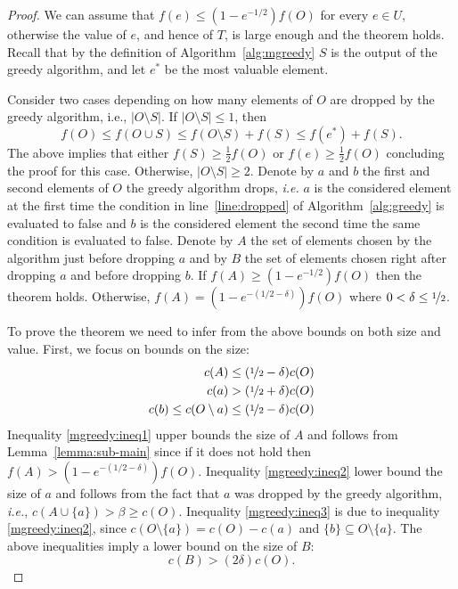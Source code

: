 \begin{proof}
	We can assume that $f(e) \leq (1 - e^{-1/2})f(O)$ for every $e \in U$, otherwise the value of $e$, and hence of $T$, is large enough and the theorem holds.
	Recall that by the definition of Algorithm~\ref{alg:mgreedy} $S$ is the output of the greedy algorithm, and let $e^*$ be the most valuable element.
	
	Consider two cases depending on how many elements of $O$ are dropped by the greedy algorithm, i.e., $|O \setminus S|$.
	If $|O \setminus S| \leq 1$, then
	$$
	f(O) \leq f(O \cup S) \leq f(O \setminus S) + f(S) \leq f(e^*) + f(S).
	$$
	The above implies that either $f(S) \geq \frac{1}{2}f(O)$ or $f(e) \geq \frac{1}{2}f(O)$ concluding the proof for this case.
	Otherwise, $|O \setminus S| \geq 2$.
	Denote by $a$ and $b$ the first and second elements of $O$ the greedy algorithm drops, {\em i.e.} $a$ is the considered element at the first time the condition in line~\ref{line:dropped} of Algorithm~\ref{alg:greedy} is evaluated to false and $b$ is the considered element the second time the same condition is evaluated to false.
	Denote by $A$ the set of elements chosen by the algorithm just before dropping $a$ and by
	$B$ the set of elements chosen right after dropping $a$ and before dropping $b$.
	If $f(A) \geq (1 - e^{-1/2})f(O)$ then the theorem holds.
	Otherwise, $f(A) = (1 - e^{-(1/2 - \delta)})f(O)$ where $0 < \delta \leq \nicefrac[]{1}{2}$.

	To prove the theorem we need to infer from the above bounds on both size and value.
	First, we focus on bounds on the size:
	\begin{align}
		\label{mgreedy:ineq1}
		c(A) \leq (\nicefrac[]{1}{2} - \delta)c(O)
		\\
		\label{mgreedy:ineq2}
		c(a) > (\nicefrac[]{1}{2} + \delta)c(O)
		\\
		\label{mgreedy:ineq3}
		c(b) \leq c(O \setminus a) \leq (\nicefrac[]{1}{2} - \delta)c(O)
	\end{align}
	Inequality \eqref{mgreedy:ineq1} upper bounds the size of $A$ and follows from  Lemma~\ref{lemma:sub-main} since if it does not hold then $f(A) > (1 - e^{-(1/2 - \delta)})f(O)$.
	Inequality \eqref{mgreedy:ineq2} lower bound the size of $a$ and follows from the fact that $a$ was dropped by the greedy algorithm, {\em i.e.}, $c(A \cup \{a\}) > \beta \geq c(O)$. Inequality \eqref{mgreedy:ineq3} is due to inequality \eqref{mgreedy:ineq2}, since $c(O \setminus \{a\}) = c(O) - c(a)$ and $\{b\} \subseteq O \setminus \{a\}$.
	The above inequalities imply a lower bound  on the size of $B$:
	\begin{equation}
		\label{mgreedy:ineq4}
		c(B) > (2\delta)c(O).
	\end{equation}


\end{proof}
